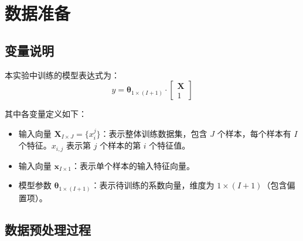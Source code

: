 \section{数据准备}
\subsection{变量说明}
本实验中训练的模型表达式为：
\[
    y = \boldsymbol{\theta}_{1 \times (I+1)} \cdot \begin{bmatrix} \boldsymbol{X} \\ 1 \end{bmatrix}
\]

其中各变量定义如下：
\begin{itemize}
\item 输入向量 $\boldsymbol{X}_{I \times J} = \{x_{i}^{j}\}$：表示整体训练数据集，包含 $J$ 个样本，每个样本有 $I$ 个特征。$x_{i,j}$ 表示第 $j$ 个样本的第 $i$ 个特征值。

\item 输入向量 $\boldsymbol{x}_{I \times 1}$：表示单个样本的输入特征向量。

\item  模型参数 $\boldsymbol{\theta}_{1 \times (I+1)}$：表示待训练的系数向量，维度为 $1 \times (I+1)$（包含偏置项）。

\end{itemize}


\subsection {数据预处理过程}
